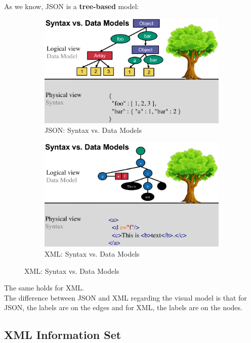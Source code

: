 \documentclass[11pt,oneside,a4paper]{article}
\begin{document}
As we know, JSON is a \textbf{tree-based} model:

\begin{figure}[hb!]
	\centering
	\begin{subfigure}[t]{.5\textwidth}
		\centering
		\includegraphics[width=0.9\linewidth]{figures/json_syntax_datamodel}
		\caption{JSON: Syntax vs. Data Models}
		\label{fig:json_syntax_datamodel}
	\end{subfigure}%
	\begin{subfigure}[t]{.5\textwidth}
		\centering
		\includegraphics[width=0.9\linewidth]{figures/xml_syntax_datamodel}
		\caption{XML: Syntax vs. Data Models}
		\label{fig:xml_syntax_datamodel}
	\end{subfigure}
\end{figure}

The same holds for XML.\\

The difference between JSON and XML regarding the visual model is that for JSON, the labels are on the edges and for XML, the labels are on the nodes.

\subsection{XML Information Set}
\end{document}
